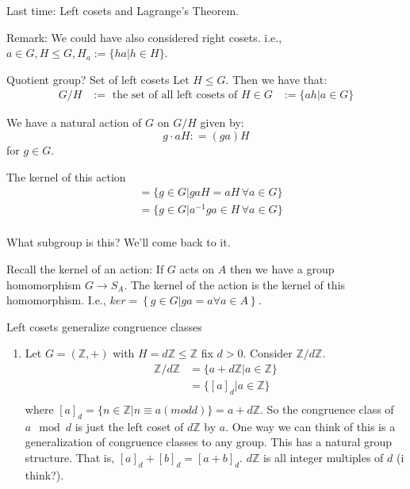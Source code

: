 \documentclass{article}
\begin{document}

Last time: Left cosets and Lagrange's Theorem.

Remark: We could have also considered right cosets. i.e., $a \in G, H \leq G, H_a := \{ha | h \in H\}$.

\begin{cdef}{Quotient group? Set of left cosets}{}
    Let $H \leq G$. Then we have that:
    \begin{align}
        G/H & := \text{ the set of all left cosets of } H \in G 
        & := \{ah | a \in G\}
    \end{align}
\end{cdef}
We have a natural action of $G$ on $G/H$ given by:
\[
    g \cdot aH : = (ga)H
\]
for $g \in G$.

The kernel of this action
\begin{align}
   & = \{ g \in G | gaH = aH \, \forall a \in G \} \\
   & = \{ g \in G | a^{-1}ga  \in H \, \forall a \in G \}\\
\end{align}

What subgroup is this? We'll come back to it.

Recall the kernel of an action: If $G$ acts on $A$ then we have a group homomorphism $G \to S_A$. The kernel of the action is the kernel of this homomorphism. I.e., $ker = \left\{ g \in G | ga = a \forall a \in A \right\}$. 

\begin{cex}{Left cosets generalize congruence classes}{}
    \begin{enumerate}
        \item Let $G = (\mathbb{Z}, +)$ with $H = d\mathbb{Z} \leq \mathbb{Z}$ fix $d > 0$. Consider $\mathbb{Z}/d\mathbb{Z}$.
            \begin{align*}
                \mathbb{Z}/d\mathbb{Z} &= \{ a + d\mathbb{Z} | a \in \mathbb{Z} \}\\
                & = \{ [a]_d | a \in \mathbb{Z} \}\\
            \end{align*}
            where $[a]_d = \{ n \in \mathbb{Z} | n \equiv a (mod d) \} = a + d\mathbb{Z}$.
            So the congruence class of $a \mod d$ is just the left coset of $d\mathbb{Z}$ by $a$. One way we can think of this is a generalization of congruence classes to any group. This has a natural group structure. That is, $[a]_d + [b]_d = [a+b]_d$.
            $d\mathbb{Z}$ is all integer multiples of $d$ (i think?).
    \end{enumerate}
\end{cex}
\end{document}
